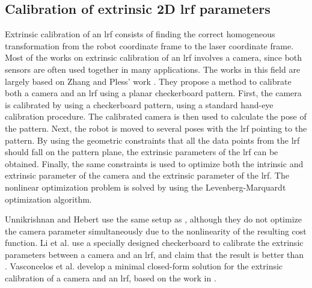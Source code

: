\subsection{Calibration of extrinsic 2D \ac{lrf} parameters}
\label{sec:laser_calib}
Extrinsic calibration of an \ac{lrf} consists of finding the correct homogeneous transformation from the robot coordinate frame to the laser coordinate frame. Most of the works on extrinsic calibration of an \ac{lrf} involves a camera, since both sensors are often used together in many applications. The works in this field are largely based on Zhang and Pless' work \cite{Zhang2004}. They propose a method to calibrate both a camera and an \ac{lrf} using a planar checkerboard pattern. First, the camera is calibrated by using a checkerboard pattern, using a standard hand-eye calibration procedure. The calibrated camera is then used to calculate the pose of the pattern. Next, the robot is moved to several poses with the \ac{lrf} pointing to the pattern. By using the geometric constraints that all the data points from the \ac{lrf} should fall on the pattern plane, the extrinsic parameters of the \ac{lrf} can be obtained. Finally, the same constraints is used to optimize both the intrinsic and extrinsic parameter of the camera and the extrinsic parameter of the \ac{lrf}. The nonlinear optimization problem is solved by using the Levenberg-Marquardt optimization algorithm.

Unnikrishnan and Hebert \cite{Unnikrishnan2005} use the same setup as \cite{Zhang2004}, although they do not optimize the camera parameter simultaneously due to the nonlinearity of the resulting cost function. 
Li et al. \cite{Li2007} use a specially designed checkerboard to calibrate the extrinsic parameters between a camera and an \ac{lrf}, and claim that the result is better than \cite{Zhang2004}. Vasconcelos et al. \cite{Vasconcelos2012} develop a minimal closed-form solution for the extrinsic calibration of a camera and an \ac{lrf}, based on the work in \cite{Zhang2004}. 


